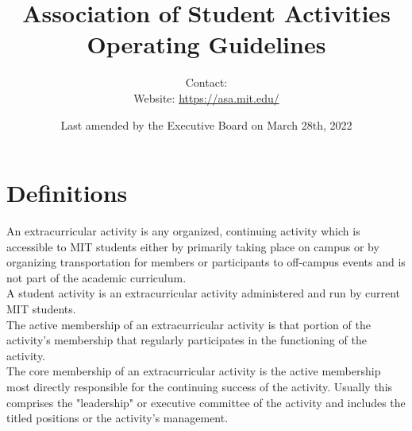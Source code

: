\documentclass[12pt]{article}
\def\groupname{Association of Student Activities}
\def\doctype{Operating Guidelines}
\begin{document}
\title{\groupname\\ \doctype}
\author{%
    Contact:  \\
    Website: \url{https://asa.mit.edu/}
}
\date{Last amended by the Executive Board on March 28th, 2022}

\maketitle

\tableofcontents

\label{art:groups}

\section{Definitions}
An extracurricular activity is any organized, continuing activity which is accessible to MIT students
either by primarily taking place on campus or by organizing transportation for members or participants to
off-campus events and is not part of the academic curriculum.
\\

A student activity is an extracurricular activity administered and run by current MIT students.
\\

The active membership of an extracurricular activity is that portion of the activity’s membership that
regularly participates in the functioning of the activity.
\\

The core membership of an extracurricular activity is the active membership most directly responsible
for the continuing success of the activity. Usually this comprises the "leadership" or executive
committee of the activity and includes the titled positions or the activity’s management.
\end{document}

